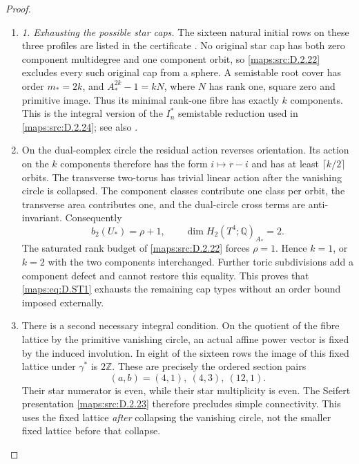 \begin{proof}
\begin{enumerate}[label=\arabic*.,leftmargin=*]
\item \emph{1. Exhausting the possible star caps.}
The sixteen natural initial rows on these three profiles are
listed in the certificate
.
No original star cap has both zero component multidegree and one
component orbit, so \ref{maps:src:D.2.22} excludes every such original cap from
a sphere. A semistable root cover has order $m_*=2k$, and
$A_*^{2k}-1=kN$, where $N$ has rank one, square zero and primitive
image. Thus its minimal rank-one fibre has exactly $k$ components.
This is the integral version of the $I_n^*$ semistable reduction
used in \ref{maps:src:D.2.24}; see also \cite[Sections 7.6--7.7]{manSS10}.

\item On the dual-complex circle the residual action reverses
orientation. Its action on the $k$ components therefore has the
form $i\mapsto r-i$ and has at least $\lceil k/2\rceil$ orbits.
The transverse two-torus has trivial linear action after the
vanishing circle is collapsed. The component classes contribute
one class per orbit, the transverse area contributes one, and
the dual-circle cross terms are anti-invariant. Consequently
\[
 b_2(U_*)=\rho+1,\qquad
 \dim H_2(T^4;\mathbb Q)_{A_*}=2.
\]
The saturated rank budget of \ref{maps:src:D.2.22} forces $\rho=1$.
Hence $k=1$, or $k=2$ with the two components interchanged.
Further toric subdivisions add a component defect and cannot
restore this equality. This proves that \eqref{maps:eq:D.ST1} exhausts the
remaining cap types without an order bound imposed externally.

\item There is a second necessary integral condition. On the quotient
of the fibre lattice by the primitive vanishing circle, an
actual affine power vector is fixed by the induced involution.
In eight of the sixteen rows the image of this fixed lattice
under $\gamma^*$ is $2\mathbb Z$. These are precisely the ordered
section pairs
\[
 (a,b)=(4,1),\ (4,3),\ (12,1).
\]
Their star numerator is even, while their star multiplicity is
even. The Seifert presentation \ref{maps:src:D.2.23} therefore precludes simple
connectivity. This uses the fixed lattice \emph{after} collapsing
the vanishing circle, not the smaller fixed lattice before that
collapse.


\end{enumerate}
\end{proof}
